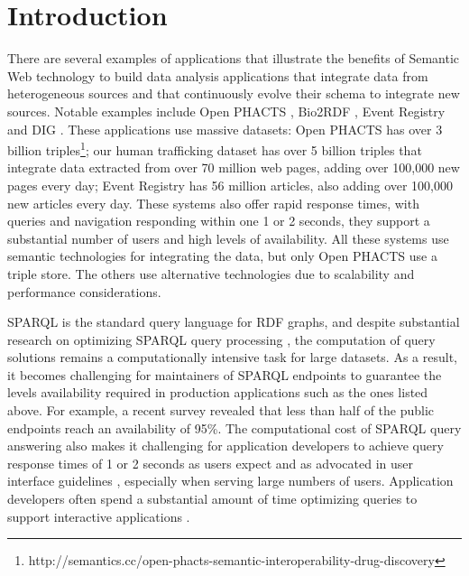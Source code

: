 \section{Introduction}
There are several examples of applications that illustrate the benefits of Semantic Web technology to build data analysis applications that integrate data from heterogeneous sources and that continuously evolve their schema to integrate new sources.
Notable examples include Open PHACTS \cite{Groth_Loizou_Gray_Goble_Harland_Pettifer_2014}, Bio2RDF \cite{callahan2013bio2rdf}, Event Registry \cite{Leban_Fortuna_Brank_Grobelnik_2014}and DIG \cite{szekely2015building}.
These applications use massive datasets: 
Open PHACTS \cite{Groth_Loizou_Gray_Goble_Harland_Pettifer_2014} has over 3 billion triples\footnote{http://semantics.cc/open-phacts-semantic-interoperability-drug-discovery};
our human trafficking dataset has over 5 billion triples that integrate data extracted from over 70 million web pages, adding over 100,000 new pages every day;
Event Registry has 56 million articles, also adding over 100,000 new articles every day.
These systems also offer rapid response times, with queries and navigation responding within one 1 or 2 seconds, they support a substantial number of users and high levels of availability.
All these systems use semantic technologies for integrating the data, but only Open PHACTS use a triple store.
The others use alternative technologies due to scalability and performance considerations.

SPARQL is the standard query language for RDF graphs, 
and despite substantial research on optimizing SPARQL query processing \cite{Pham2013}, the computation of query solutions remains a computationally intensive task for large datasets.
As a result, it becomes challenging for maintainers of SPARQL endpoints to guarantee the levels availability required in production applications such as the ones listed above.
For example, a recent survey \cite{buil2013sparql} revealed that less than half of the public endpoints reach an availability of 95\%.
The computational cost of SPARQL query answering also makes it challenging for application developers to achieve query response times of 1 or 2 seconds as users expect and as advocated in user interface guidelines \cite{nielsen1994usability}, especially when serving large numbers of users.
Application developers often spend a substantial amount of time optimizing queries to support interactive applications \cite{Loizou_Angles_Groth_2014}.

